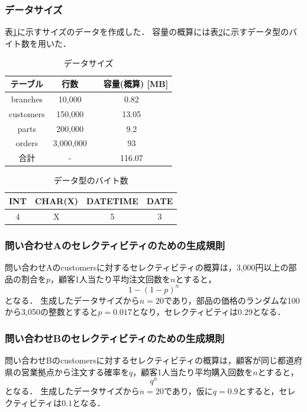 \documentclass{jsarticle}
\begin{document}
\subsubsection{データサイズ}
表\ref{data-size}に示すサイズのデータを作成した．
容量の概算には表\ref{sizeof-type}に示すデータ型のバイト数\cite{mysql-data-type-size}を用いた．
\begin{table}[htb]
  \begin{center}
    \caption{データサイズ}
    \label{data-size}
    \begin{tabular}{|c|c|c|}\hline
      テーブル & 行数 &　容量(概算) [MB] \\ \hline
      branches & 10,000 & 0.82 \\
      customers & 150,000 & 13.05 \\
      parts & 200,000 & 9.2 \\
      orders & 3,000,000 & 93 \\ \hline
      合計 & - & 116.07 \\ \hline
    \end{tabular}
  \end{center}
\end{table}

\begin{table}[htb]
  \begin{center}
    \caption{データ型のバイト数}
    \label{sizeof-type}
    \begin{tabular}{|c|c|c|c|}\hline
      INT & CHAR(X) & DATETIME & DATE \\ \hline
      4 & X & 5 & 3 \\ \hline
    \end{tabular}
  \end{center}
\end{table}

\subsubsection{問い合わせAのセレクティビティのための生成規則}
\label{selectivity-for-a}
問い合わせAのcustomersに対するセレクティビティの概算は，3,000円以上の部品の割合を$ p $，顧客1人当たり平均注文回数を$ n $とすると，
\[
  1 - (1 - p)^{n}
\]
となる．
生成したデータサイズから$ n = 20 $であり，部品の価格のランダムな100から3,050の整数とすると$ p = 0.017 $となり，セレクティビティは$ 0.29 $となる．

\subsubsection{問い合わせBのセレクティビティのための生成規則}
\label{selectivity-for-b}
問い合わせBのcustomersに対するセレクティビティの概算は，顧客が同じ都道府県の営業拠点から注文する確率を$ q $，顧客1人当たり平均購入回数を$ n $とすると，
\[ 
  q ^ {n}
\]
となる．
生成したデータサイズから$ n = 20 $であり，仮に$ q = 0.9 $とすると，セレクティビティは$ 0.1 $となる．
\end{document}
